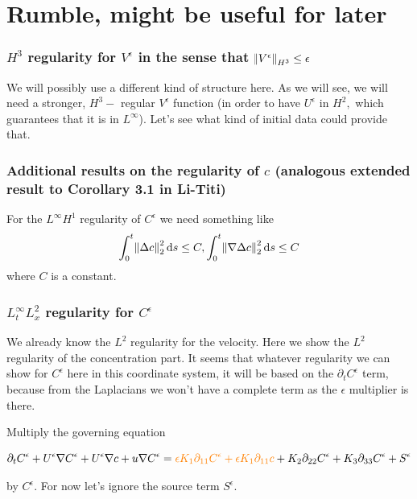 \documentclass[11pt]{article}
\newcommand*\diff{\mathop{}\!\mathrm{d}}
\begin{document}
\section{Rumble, might be useful for later}

   \subsubsection{$H^3$ regularity for $V^\epsilon$ in the sense that $\norm{V^\epsilon}_{H^3} \leq \epsilon$} \label{H3eps}
We will possibly use a different kind of structure here. As we will see, we will need a stronger, $H^3-$ regular $V^\epsilon$ function (in order to have $U^\epsilon$ in $H^2,$ which guarantees that it is in $L^\infty$). Let's see what kind of initial data could provide that.

    \subsubsection{Additional results on the regularity of $c$ (analogous extended result to Corollary 3.1 in Li-Titi)} \label{extendedprimitiveeqsolest}
    
    For the $L^\infty H^1$ regularity of $C^\epsilon$ we need something like $$\int_0^t \norm{\Delta c}_2^2 \diff s \leq C, \int_0^t \norm{\nabla \Delta c}_2^2 \diff s \leq C$$ where $C$ is a constant.
    
    \subsubsection{$L_t^\infty L_x^2$ regularity for $C^\epsilon$}
    
    We already know the $L^2$ regularity for the velocity. Here we show the $L^2$ regularity of the concentration part.
    It seems that whatever regularity we can show for $C^\epsilon$ here in this coordinate system, it will be based on the $\partial_t C^\epsilon$ term, because from the Laplacians we won't have a complete term as the $\epsilon$ multiplier is there.
    
    Multiply the governing equation

$$ \partial_t C^\epsilon + U^\epsilon \nabla C^\epsilon  + U^\epsilon \nabla c+ u \nabla C^\epsilon = \textcolor{orange}{\epsilon K_1 \partial_{11} C^\epsilon + \epsilon K_1 \partial_{11} c} + K_2 \partial_{22} C^\epsilon + K_3 \partial_{33} C^\epsilon + S^\epsilon $$

by $C^\epsilon.$ For now let's ignore the source term  $S^\epsilon.$
\end{document}
